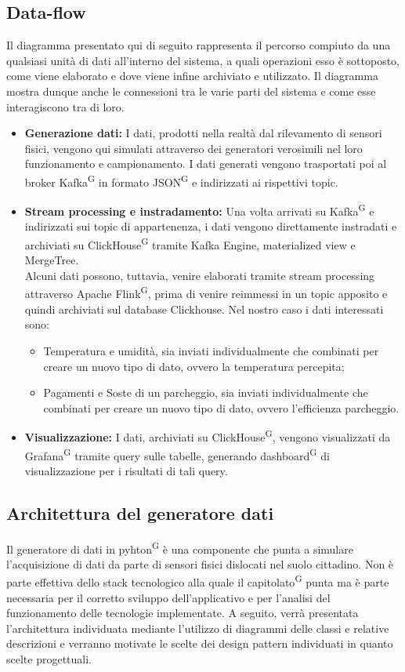 \documentclass[8pt]{article}
\newcommand{\glossterm}[1]{#1\textsuperscript{G}} %
\begin{document}
\subsection{Data-flow}
Il diagramma presentato qui di seguito rappresenta il percorso compiuto da una qualsiasi unità di dati all'interno del sistema, a quali operazioni esso è sottoposto, come viene elaborato e dove viene infine archiviato e utilizzato. Il diagramma mostra dunque anche le connessioni tra le varie parti del sistema e come esse interagiscono tra di loro.
\begin{itemize}
    \item \textbf{Generazione dati:} I dati, prodotti nella realtà dal rilevamento di sensori fisici, vengono qui simulati attraverso dei generatori verosimili nel loro funzionamento e campionamento. I dati generati vengono trasportati poi al broker \glossterm{Kafka} in formato \glossterm{JSON} e indirizzati ai rispettivi topic.
    \item \textbf{Stream processing e instradamento:} Una volta arrivati su \glossterm{Kafka} e indirizzati sui topic di appartenenza, i dati vengono direttamente instradati e archiviati su \glossterm{ClickHouse} tramite Kafka Engine, materialized view e MergeTree. \\
    Alcuni dati possono, tuttavia, venire elaborati tramite stream processing attraverso Apache \glossterm{Flink}, prima di venire reimmessi in un topic apposito e quindi archiviati sul database Clickhouse. Nel nostro caso i dati interessati sono: 
    \begin{itemize}
    	\item Temperatura e umidità, sia inviati individualmente che combinati per creare un nuovo tipo di dato, ovvero la temperatura percepita;
    	\item Pagamenti e Soste di un parcheggio, sia inviati individualmente che combinati per creare un nuovo tipo di dato, ovvero l'efficienza parcheggio.
    \end{itemize}
    \item \textbf{Visualizzazione:} I dati, archiviati su \glossterm{ClickHouse}, vengono visualizzati da \glossterm{Grafana} tramite query sulle tabelle, generando \glossterm{dashboard} di visualizzazione per i risultati di tali query.
\end{itemize}
\subsection{Architettura del generatore dati}
Il generatore di dati in \glossterm{pyhton} è una componente che punta a simulare l'acquisizione di dati da parte di sensori fisici dislocati nel suolo cittadino. Non è parte effettiva dello stack tecnologico alla quale il \glossterm{capitolato} punta ma è parte necessaria per il corretto sviluppo dell'applicativo e per l'analisi del funzionamento delle tecnologie implementate. A seguito, verrà presentata l’architettura individuata mediante l’utilizzo di diagrammi delle classi e relative descrizioni e verranno motivate le scelte dei design pattern individuati in quanto scelte progettuali.
\clearpage
\end{document}
